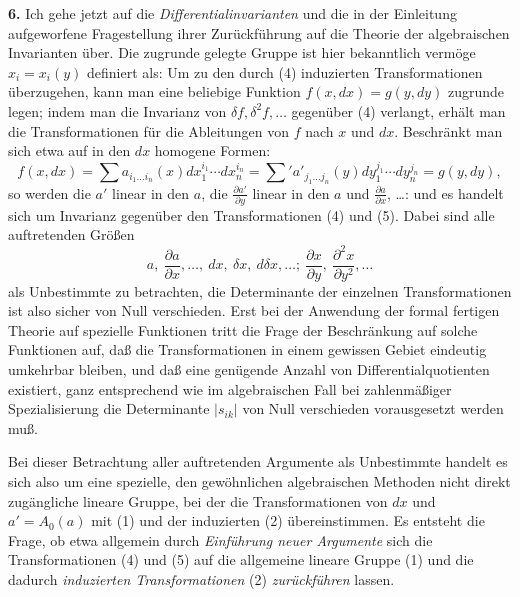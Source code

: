 \textbf{6.} Ich gehe jetzt auf die \emph{Differentialinvarianten} und die in der Einleitung aufgeworfene Fragestellung ihrer Zurückführung auf die Theorie der algebraischen Invarianten über. Die zugrunde gelegte Gruppe ist hier bekanntlich vermöge $x_i=x_i(y)$ definiert als:
Um zu den durch (4) induzierten Transformationen überzugehen, kann man eine beliebige Funktion $f(x,d x)=g(y,d y)$ zugrunde legen; indem man die Invarianz von $\delta f,\delta^2f,\ldots$ gegenüber (4) verlangt, erhält man die Transformationen für die Ableitungen von $f$ nach $x$ und $d x$. Beschränkt man sich etwa auf in den $d x$ homogene Formen:
\[
 f(x,d x)=\sum a_{i_1\ldots i_n}(x)d x_1^{i_1}\cdots d x_n^{i_n}
 =\sum{}' a'_{j_1\ldots j_n}(y)d y_1^{j_1}\cdots d y_n^{j_n}
 =g(y,d y),
\]
so werden die $a'$ linear in den $a$, die $\frac{\partial a'}{\partial y}$ linear in den $a$ und $\frac{\partial a}{\partial x}$, \ldots:
und es handelt sich um Invarianz gegenüber den Transformationen (4) und (5). Dabei sind alle auftretenden Größen
\[
a,\ \frac{\partial a}{\partial x},\ldots,\ d x,\ \delta x,\ d\delta x,\ldots;\ 
\frac{\partial x}{\partial y},\ \frac{\partial^2 x}{\partial y^2},\ldots
\]
als Unbestimmte zu betrachten, die Determinante der einzelnen Transformationen ist also sicher von Null verschieden. Erst bei der Anwendung der formal fertigen Theorie auf spezielle Funktionen tritt die Frage der Beschränkung auf solche Funktionen auf, daß die Transformationen in einem gewissen Gebiet eindeutig umkehrbar bleiben, und daß eine genügende Anzahl von Differentialquotienten existiert, ganz entsprechend wie im algebraischen Fall bei zahlenmäßiger Spezialisierung die Determinante $|s_{ik}|$ von Null verschieden vorausgesetzt werden muß.

Bei dieser Betrachtung aller auftretenden Argumente als Unbestimmte handelt es sich also um eine spezielle, den gewöhnlichen algebraischen Methoden nicht direkt zugängliche lineare Gruppe, bei der die Transformationen von $d x$ und $a'=A_0(a)$ mit (1) und der induzierten (2) übereinstimmen. Es entsteht die Frage, ob etwa allgemein durch \emph{Einführung neuer Argumente} sich die Transformationen (4) und (5) auf die allgemeine lineare Gruppe (1) und die dadurch \emph{induzierten Transformationen} (2) \emph{zurückführen} lassen.

